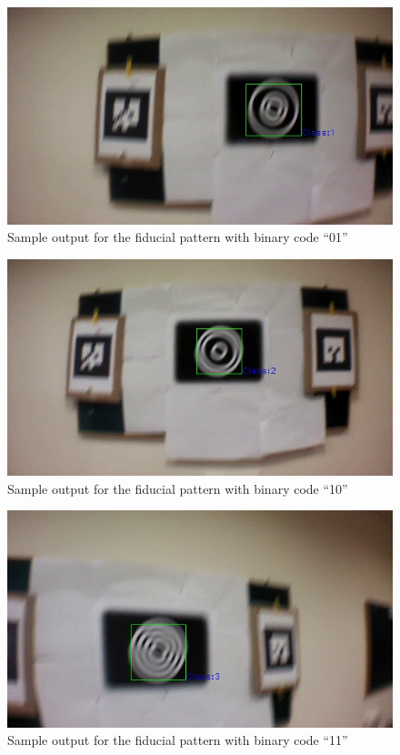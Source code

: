 \documentclass[runningheads]{llncs}
\begin{document}
\begin{figure}
\centering
  \includegraphics[width=.8\linewidth]{output_01.jpg}
  \caption{Sample output for the fiducial pattern with binary code ``01''}
  \label{fig:output1}
\end{figure}

\begin{figure}
\centering
  \includegraphics[width=.8\linewidth]{output_10.jpg}
  \caption{Sample output for the fiducial pattern with binary code ``10''}
  \label{fig:output2}
\end{figure}

\begin{figure}
\centering
  \includegraphics[width=.8\linewidth]{output_11.jpg}
  \caption{Sample output for the fiducial pattern with binary code ``11''}
  \label{fig:output3}
\end{figure}
\end{document}
